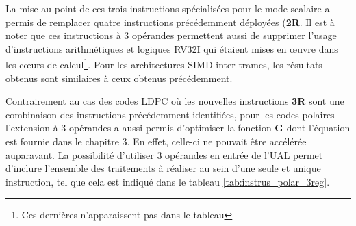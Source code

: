 \documentclass[../main.tex]{subfiles}
\begin{document}
La mise au point de ces trois instructions spécialisées pour le mode scalaire a permis de remplacer quatre instructions précédemment déployées (\textbf{2R}.
Il est à noter que ces instructions à 3 opérandes permettent aussi de supprimer l'usage d'instructions arithmétiques et logiques RV32I qui étaient mises en œuvre dans les cœurs de calcul\footnote{Ces dernières n'apparaissent pas dans le tableau}.
Pour les architectures SIMD inter-trames, les résultats obtenus sont similaires à ceux obtenus précédemment.

Contrairement au cas des codes LDPC où les nouvelles instructions \textbf{3R} sont une combinaison des instructions précédemment identifiées, pour les codes polaires l'extension à 3 opérandes a aussi permis d'optimiser la fonction \textbf{G} dont l'équation est fournie dans le chapitre 3.
En effet, celle-ci ne pouvait être accélérée auparavant.
La possibilité d'utiliser 3 opérandes en entrée de l'UAL permet d'inclure l'ensemble des traitements à réaliser au sein d'une seule et unique instruction, tel que cela est indiqué dans le tableau \ref{tab:instrus_polar_3reg}.
\end{document}
